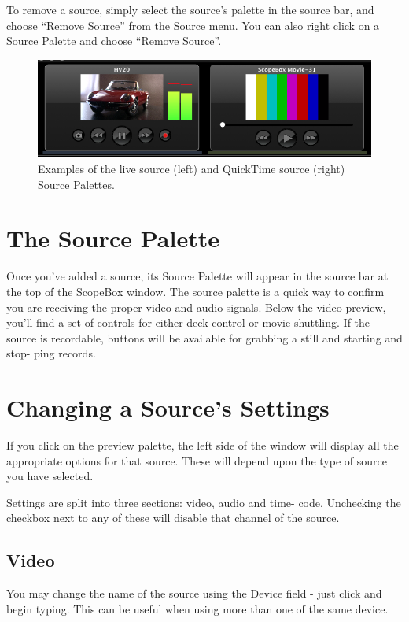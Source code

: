 \documentclass[10,letterpaper,]{report}
\begin{document}
To remove a source, simply select the source's palette in the source
bar, and choose ``Remove Source'' from the Source menu. You can also
right click on a Source Palette and choose ``Remove Source''.

\begin{figure}[htbp]
\centering
\includegraphics{images/DualSources.png}
\caption{Examples of the live source (left) and QuickTime source (right)
Source Palettes.}
\end{figure}

\section{The Source Palette}

Once you've added a source, its Source Palette will appear in the source
bar at the top of the ScopeBox window. The source palette is a quick way
to confirm you are receiving the proper video and audio signals. Below
the video preview, you'll find a set of controls for either deck control
or movie shuttling. If the source is recordable, buttons will be
available for grabbing a still and starting and stop- ping records.

\section{Changing a Source's Settings}

If you click on the preview palette, the left side of the window will
display all the appropriate options for that source. These will depend
upon the type of source you have selected.

Settings are split into three sections: video, audio and time- code.
Unchecking the checkbox next to any of these will disable that channel
of the source.

\subsection{Video}

You may change the name of the source using the Device field - just
click and begin typing. This can be useful when using more than one of
the same device.
\end{document}
